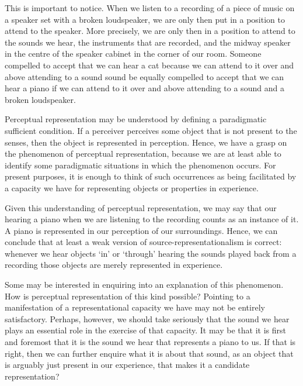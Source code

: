 \documentclass[sloppy, journal, git, bytitle, dodraft]{humapap}
\begin{document}
This is important to notice. When we listen to a recording of a piece of music on a speaker set with a broken loudspeaker, we are only then put in a position to attend to the speaker. More precisely, we are only then in a position to attend to the sounds we hear, the instruments that are recorded, and the midway speaker in the centre of the speaker cabinet in the corner of our room. Someone compelled to accept that we can hear a cat because we can attend to it over and above attending to a sound sound be equally compelled to accept that we can hear a piano if we can attend to it over and above attending to a sound and a broken loudspeaker.


\sect Perceptual representation may be understood by defining a paradigmatic sufficient condition. If a perceiver perceives some object that is not present to the senses, then the object is represented in perception. Hence, we have a grasp on the phenomenon of perceptual representation, because we are at least able to identify some paradigmatic situations in which the phenomenon occurs. For present purposes, it is enough to think of such occurrences as being facilitated by a capacity we have for representing objects or properties in experience. 

Given this understanding of perceptual representation, we may say that our hearing a piano when we are listening to the recording counts as an instance of it. A piano is represented in our perception of our surroundings. Hence, we can conclude that at least a weak version of source-representationalism is correct: whenever we hear objects `in' or `through' hearing the sounds played back from a recording those objects are merely represented in experience. 

Some may be interested in enquiring into an explanation of this phenomenon. How is perceptual representation of this kind possible? Pointing to a manifestation of a representational capacity we have may not be entirely satisfactory. Perhaps, however, we should take seriously that the sound we hear plays an essential role in the exercise of that capacity. It may be that it is first and foremost that it is the sound we hear that represents a piano to us. If that is right, then we can further enquire what it is about that sound, as an object that is arguably just present in our experience, that makes it a candidate representation? 
\end{document}
